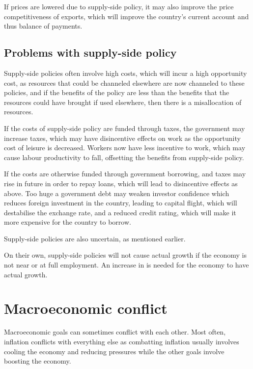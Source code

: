 \documentclass[Economics.tex]{subfiles}
\begin{document}
If prices are lowered due to supply-side policy, it may also improve the price competitiveness of exports, which will improve the country's current account and thus balance of payments.
\subsection{Problems with supply-side policy}
Sup\-ply-side policies often involve high costs, which will incur a high opportunity cost, as resources that could be channeled elsewhere are now channeled to these policies, and if the benefits of the policy are less than the benefits that the resources could have brought if used elsewhere, then there is a misallocation of resources.

If the costs of supply-side policy are funded through taxes, the government may increase taxes, which may have disincentive effects on work as the opportunity cost of leisure is decreased. Workers now have less incentive to work, which may cause labour productivity to fall, offsetting the benefits from supply-side policy.

If the costs are otherwise funded through government borrowing, and taxes may rise in future in order to repay loans, which will lead to disincentive effects as above. Too huge a government debt may weaken investor confidence which reduces foreign investment in the country, leading to capital flight, which will destabilise the exchange rate, and a reduced credit rating, which will make it more expensive for the country to borrow.

Supply-side policies are also uncertain, as mentioned earlier.

On their own, supply-side policies will not cause actual growth if the economy is not near or at full employment. An increase in \AD{} is needed for the economy to have actual growth.
\section{Macroeconomic conflict}
Macroeconomic goals can sometimes conflict with each other. Most often, inflation conflicts with everything else as combatting inflation usually involves cooling the economy and reducing pressures while the other goals involve boosting the economy.
\end{document}
